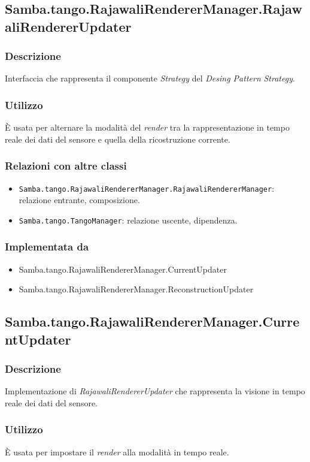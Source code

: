 \subsection{Samba.tango.RajawaliRendererManager.RajawaliRendererUpdater}
\subsubsection{Descrizione}
Interfaccia che rappresenta il componente \emph{Strategy} del \emph{Desing Pattern} \emph{Strategy}.
\subsubsection{Utilizzo}
È usata per alternare la modalità del \emph{render} tra la rappresentazione in tempo reale dei dati del sensore e quella della ricostruzione corrente.
\subsubsection{Relazioni con altre classi}
\begin{itemize}
	\item \texttt{Samba.tango.RajawaliRendererManager.RajawaliRendererManager}: relazione entrante, composizione.
	\item \texttt{Samba.tango.TangoManager}: relazione uscente, dipendenza.
\end{itemize}
\subsubsection{Implementata da}
\begin{itemize}
	\item Samba.tango.RajawaliRendererManager.CurrentUpdater
	\item Samba.tango.RajawaliRendererManager.ReconstructionUpdater
\end{itemize}


\subsection{Samba.tango.RajawaliRendererManager.CurrentUpdater}
\subsubsection{Descrizione}
Implementazione di \emph{RajawaliRendererUpdater} che rappresenta la visione in tempo reale dei dati del sensore.
\subsubsection{Utilizzo}
È usata per impostare il \emph{render} alla modalità in tempo reale.
